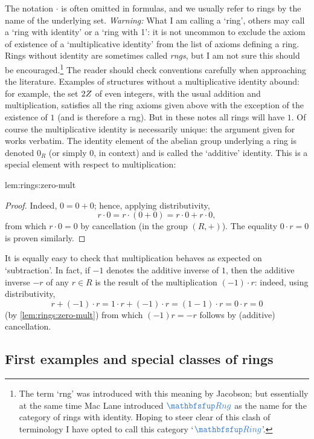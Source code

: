 The notation $\cdot$ is often omitted in formulas, and we usually
refer to rings by the name of the underlying set.  \emph{Warning:}
What I am calling a `ring', others may call a `ring with identity' or
a `ring with 1': it is not uncommon to exclude the axiom of existence
of a `multiplicative identity' from the list of axioms defining a
ring. Rings without identity are sometimes called \emph{rngs}, but I
am not sure this should be encouraged.\footnote{The term `rng' was
  introduced with this meaning by Jacobson; but essentially at the
  same time Mac Lane introduced $\categ{Rng}$ as the name for the
  category of rings with identity. Hoping to steer clear of this clash
  of terminology I have opted to call this category `$\categ{Ring}$'.}
The reader should check conventions carefully when approaching the
literature.  Examples of structures without a multiplicative identity
abound: for example, the set $2Z$ of even integers, with the usual
addition and multiplication, satisfies all the ring axioms given above
with the exception of the existence of $1$ (and is therefore a
rng). But in these notes all rings will have $1$.  Of course the
multiplicative identity is necessarily unique: the argument given for
 works verbatim.  The identity
element of the abelian group underlying a ring is denoted $0_R$ (or
simply $0$, in context) and is called the `additive' identity. This is
a special element with respect to multiplication:

\begin{lem}{}{lem:rings:zero-mult}
\end{lem}
\begin{proof}
  Indeed, $0 = 0 + 0$; hence, applying distributivity,
  \[
    r \cdot 0 = r \cdot (0 + 0) = r \cdot 0 + r \cdot 0,
  \]
  from which $r \cdot 0 = 0$ by cancellation (in the group $(R,
  +)$). The equality $0 \cdot r = 0$ is proven similarly.
\end{proof}
It is equally easy to check that multiplication behaves as expected on
`subtraction'.  In fact, if $-1$ denotes the additive inverse of $1$,
then the additive inverse $-r$ of any $r \in R$ is the result of the
multiplication $(-1) \cdot r$: indeed, using distributivity,
\[
  r + (-1) \cdot r = 1 \cdot r + (-1) \cdot r = (1 - 1) \cdot r = 0
  \cdot r = 0
\]
(by \cref{lem:rings:zero-mult}) from which $(-1)r = -r$ follows by
(additive) cancellation.

\subsection{First examples and special classes of rings}
\label{subsec:rings:first-examples-and-special-classes-of-rings}

